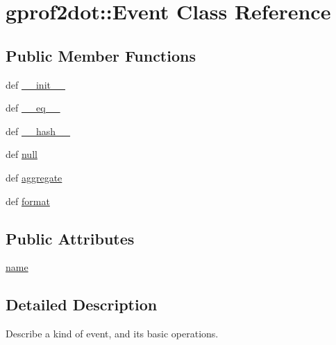 \hypertarget{classgprof2dot_1_1Event}{
\section{gprof2dot::Event Class Reference}
\label{classgprof2dot_1_1Event}
}
\subsection*{Public Member Functions}
\begin{DoxyCompactItemize}
\item 
def \hyperlink{classgprof2dot_1_1Event_afa20b60008552a9204e4f03f0ee2ad6c}{\_\-\_\-init\_\-\_\-}
\item 
def \hyperlink{classgprof2dot_1_1Event_afddebbd653160481ff08fc7bf13d3cf2}{\_\-\_\-eq\_\-\_\-}
\item 
def \hyperlink{classgprof2dot_1_1Event_a66169db3de36baebd5d86d0cbcf21375}{\_\-\_\-hash\_\-\_\-}
\item 
def \hyperlink{classgprof2dot_1_1Event_acc16d016d072bc771eeda1a34997640f}{null}
\item 
def \hyperlink{classgprof2dot_1_1Event_afd3d6cb21db851048e9f59313fb189fe}{aggregate}
\item 
def \hyperlink{classgprof2dot_1_1Event_aeaeda65173fc69ffcc789351cadd30c3}{format}
\end{DoxyCompactItemize}
\subsection*{Public Attributes}
\begin{DoxyCompactItemize}
\item 
\hyperlink{classgprof2dot_1_1Event_ab50107b4654bfae38cd0c6de3a66a53b}{name}
\end{DoxyCompactItemize}


\subsection{Detailed Description}
\begin{DoxyVerb}Describe a kind of event, and its basic operations.\end{DoxyVerb}
 

